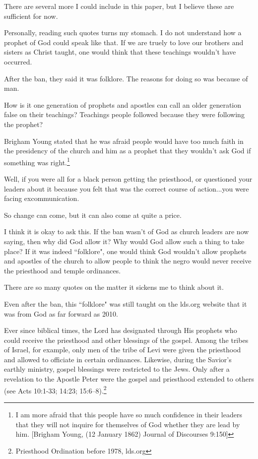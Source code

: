 \documentclass{article}
\begin{document}
There are several more I could include in this paper, but I believe these
are sufficient for now.

Personally, reading such quotes turns my stomach. I do not understand how a 
prophet of God could speak like that. If we are truely to love our brothers
and sisters as Christ taught, one would think that these teachings wouldn't
have occurred.

After the ban, they said it was folklore. The reasons for doing so was because 
of man.

How is it one generation of prophets and apostles can call an older generation 
false on their teachings? Teachings people followed because they were following 
the prophet?

Brigham Young stated that he was afraid people would have too much faith in the 
presidency of the church and him as a prophet that they wouldn't ask God if 
something was right.\footnote{I am more afraid that this people have so much 
confidence in their leaders that they will not inquire for themselves of God 
whether they are lead by him. [Brigham Young, (12 January 1862) Journal of 
Discourses 9:150]}

Well, if you were all for a black person getting the priesthood, or questioned 
your leaders about it because you felt that was the correct course of 
action...you were facing excommunication.

So change can come, but it can also come at quite a price.

I think it is okay to ask this. If the ban wasn't of God as church leaders are 
now saying, then why did God allow it? Why would God allow such a thing to take 
place? If it was indeed ``folklore", one would think God wouldn't allow prophets 
and apostles of the church to allow people to think the negro would never 
receive the priesthood and temple ordinances.

There are so many quotes on the matter it sickens me to think about it.

Even after the ban, this ``folklore" was still taught on the lds.org 
website that it was from God as far forward as 2010.

\begin{displayquote}
Ever  since  biblical  times,  the  Lord  has  designated  through  His  
prophets  who  could  receive  the priesthood  and  other  blessings  of  the  
gospel.  Among  the  tribes  of  Israel,  for  example,  only  men  of  
the tribe  of  Levi  were  given  the  priesthood  and  allowed  to  
officiate  in  certain  ordinances.  Likewise,  during  the Savior's  
earthly  ministry,  gospel  blessings  were  restricted  to  the  Jews.  
Only  after  a  revelation  to  the Apostle  Peter  were  the  gospel  and  
priesthood  extended  to  others  
(see  Acts  10:1-33;  
14:23;  15:6–8).\footnote{Priesthood  Ordination  before  1978, lds.org}
\end{displayquote}
\end{document}
